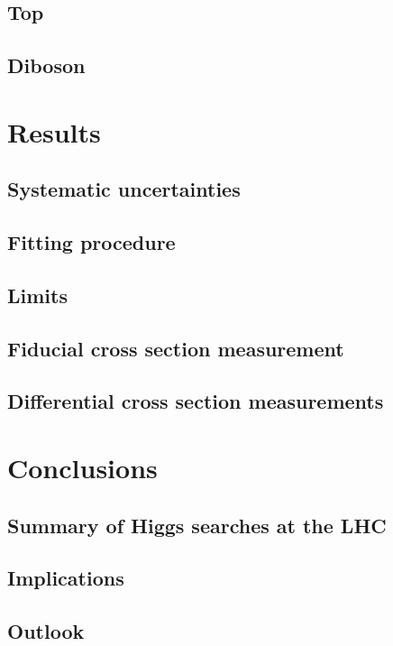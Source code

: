 \documentclass[hyper,linkcolor=blue]{mythesis}
\begin{document}
\begin{mainmatter}
    \section{Top}
      \label{sec:top}
      
    \section{\Zjets}
      \label{sec:dy}
      
    \section{Diboson}
      \label{sec:diboson}
      

  \chapter{Results}
    \label{chap:results}
    
    \section{Systematic uncertainties}
      \label{sec:systematics}
      
    \section{Fitting procedure}
    \section{Limits}
    \section{Fiducial cross section measurement}
      \label{sec:fiducial}
      
    \section{Differential cross section measurements}
      \label{sec:unfolding}
      

  \chapter{Conclusions}
    \label{chap:conclusions}
    
    \section{Summary of Higgs searches at the LHC}
      \label{sec:searches}
      
    \section{Implications}
      \label{sec:implications}
      
    \section{Outlook}
      \label{sec:outlook}
      
\end{mainmatter}
\end{document}
